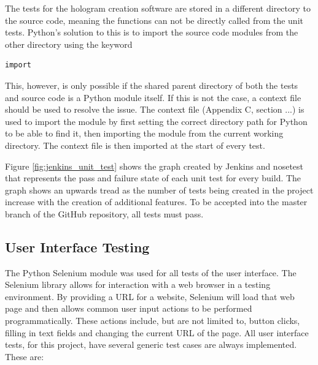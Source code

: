 The tests for the hologram creation software are stored in a different directory to the source code, meaning the functions can not be directly called from the unit tests. Python's solution to this is to import the source code modules from the other directory using the keyword
\begin{verbatim}
import
\end{verbatim}
This, however, is only possible if the shared parent directory of both the tests and source code is a Python module itself. If this is not the case, a context file should be used to resolve the issue. The context file (Appendix C, section ...) is used to import the module by first setting the correct directory path for Python to be able to find it, then importing the module from the current working directory. The context file is then imported at the start of every test.

Figure \ref{fig:jenkins_unit_test} shows the graph created by Jenkins and nosetest that represents the pass and failure state of each unit test for every build. The graph shows an upwards tread as the number of tests being created in the project increase with the creation of additional features. To be accepted into the master branch of the GitHub repository, all tests must pass.

\begin{figure}[h!]
\end{figure}

\subsection{User Interface Testing}
The Python Selenium module was used for all tests of the user interface. The Selenium library allows for interaction with a web browser in a testing environment. By providing a URL for a website, Selenium will load that web page and then allows common user input actions to be performed programmatically. These actions include, but are not limited to, button clicks, filling in text fields and changing the current URL of the page. All user interface tests, for this project, have several generic test cases are always implemented. These are:


